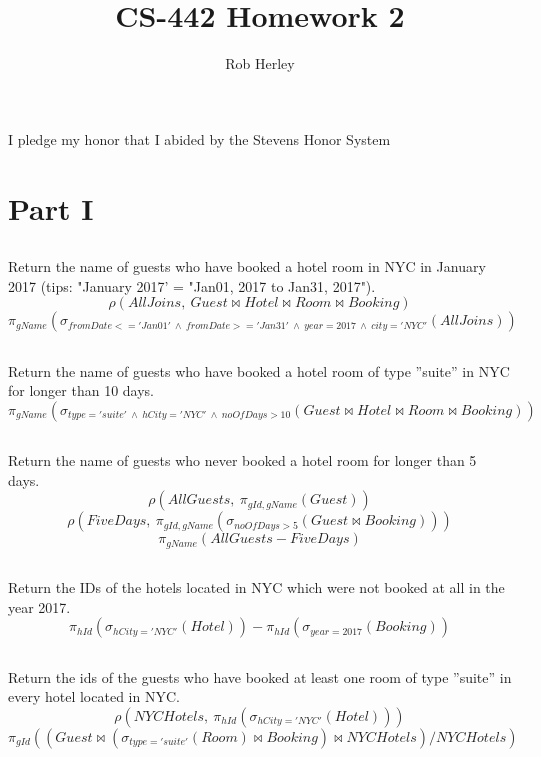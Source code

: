 \documentclass{article}
\begin{document}
\title{CS-442 Homework 2}
\author{Rob Herley}

\maketitle

\begin{center}
I pledge my honor that I abided by the Stevens Honor System
\end{center}

\section{Part I}
\subsection{}
Return the name of guests who have booked a hotel room in NYC in January 2017 (tips: "January 2017' = "Jan01, 2017 to Jan31, 2017").
$$\rho(AllJoins,\  Guest\bowtie Hotel\bowtie Room\bowtie Booking) $$
$$\pi _{ gName }(\sigma _{ fromDate<='Jan01'\  \wedge \  fromDate>='Jan31'\  \wedge \  year=2017\  \wedge \  city='NYC' }(AllJoins))$$

\subsection{}
Return the name of guests who have booked a hotel room of type ''suite'' in NYC for longer than 10 days.
$$\pi _{ gName }(\sigma _{ type='suite'\ \wedge \ hCity='NYC'\ \wedge \ noOfDays>10 }(Guest\bowtie Hotel\bowtie Room\bowtie Booking))$$

\subsection{}
Return the name of guests who never booked a hotel room for longer than 5 days.
$$\rho (AllGuests,\ \pi_{gId, gName}(Guest))$$
$$\rho (FiveDays,\ \pi_{gId, gName}(\sigma _{ noOfDays > 5 }(Guest \bowtie Booking)))$$
$$\pi_{gName}(AllGuests - FiveDays)$$

\subsection{}
Return the IDs of the hotels located in NYC which were not booked at all in the year 2017.
$$\pi_{hId}(\sigma_{hCity='NYC'}(Hotel))-\pi_{hId}(\sigma_{year=2017}(Booking))$$

\subsection{}
Return the ids of the guests who have booked at least one room of type ''suite'' in every hotel located in NYC.
$$\rho(NYCHotels, \ \pi_{hId}(\sigma_{hCity='NYC'}(Hotel)))$$
$$\pi_{gId}((Guest\bowtie(\sigma_{type='suite'}(Room)\bowtie Booking) \bowtie NYCHotels) / NYCHotels)$$
\end{document}
